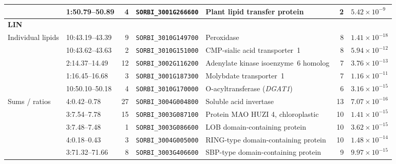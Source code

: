 \documentclass[9pt,twocolumn,twoside]{rilabRxiv}
\begin{document}
\begin{table}[!ht]
\begin{tabular}{llrllrl}
 & 1:50.79--50.89 & 4 & \texttt{SORBI\_3001G266600} & Plant lipid transfer protein & 2 & $5.42\times10^{-9}$ \\
\midrule
\multicolumn{7}{l}{\textbf{LIN}} \\
Individual lipids & 10:43.19--43.39 & 9 & \texttt{SORBI\_3010G149700} & Peroxidase & 8 & $1.41\times10^{-18}$ \\
 & 10:43.62--43.63 & 2 & \texttt{SORBI\_3010G151000} & CMP-sialic acid transporter~1 & 8 & $5.94\times10^{-12}$ \\
 & 2:14.37--14.49 & 12 & \texttt{SORBI\_3002G116200} & Adenylate kinase isoenzyme~6 homolog & 7 & $3.76\times10^{-13}$ \\
 & 1:16.45--16.68 & 3 & \texttt{SORBI\_3001G187300} & Molybdate transporter~1 & 7 & $1.16\times10^{-11}$ \\
 & 10:50.10--50.18 & 4 & \texttt{SORBI\_3010G170000} & O-acyltransferase (\textit{DGAT1}) & 6 & $3.16\times10^{-15}$ \\
\addlinespace
Sums / ratios & 4:0.42--0.78 & 27 & \texttt{SORBI\_3004G004800} & Soluble acid invertase & 13 & $7.07\times10^{-16}$ \\
 & 3:7.54--7.78 & 15 & \texttt{SORBI\_3003G087100} & Protein MAO HUZI 4, chloroplastic & 10 & $1.41\times10^{-15}$ \\
 & 3:7.48--7.48 & 1 & \texttt{SORBI\_3003G086600} & LOB domain-containing protein & 10 & $3.62\times10^{-15}$ \\
 & 4:0.18--0.43 & 3 & \texttt{SORBI\_3004G005000} & RING-type domain-containing protein & 10 & $1.48\times10^{-14}$ \\
 & 3:71.32--71.66 & 8 & \texttt{SORBI\_3003G406600} & SBP-type domain-containing protein & 9 & $9.97\times10^{-15}$ \\
\bottomrule
\end{tabular}
\end{table}
\end{document}
